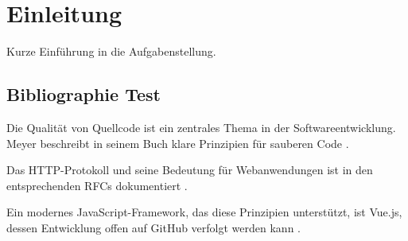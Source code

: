 	\section{Einleitung}
	Kurze Einführung in die Aufgabenstellung.
	
	\subsection{Bibliographie Test}
	
	Die Qualität von Quellcode ist ein zentrales Thema in der Softwareentwicklung. Meyer beschreibt in seinem Buch klare Prinzipien für sauberen Code \cite{meyer2008clean}. 
	
	Das HTTP-Protokoll und seine Bedeutung für Webanwendungen ist in den entsprechenden RFCs dokumentiert \cite{rfc7231}.
	
	Ein modernes JavaScript-Framework, das diese Prinzipien unterstützt, ist Vue.js, dessen Entwicklung offen auf GitHub verfolgt werden kann \cite{github_vue}.
	
